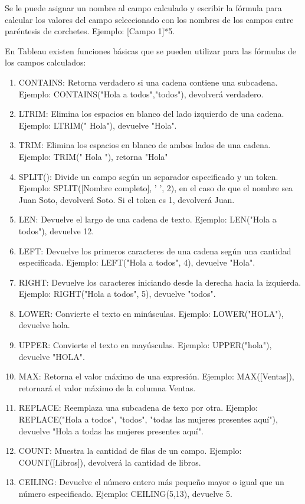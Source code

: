 \documentclass[a4paper, 12pt]{book}
\begin{document}
Se le puede asignar un nombre al campo calculado y escribir la fórmula para calcular los valores del campo seleccionado con los nombres de los campos entre paréntesis de corchetes. Ejemplo: [Campo 1]*5.

En Tableau existen funciones básicas que se pueden utilizar para las fórmulas de los campos calculados:
\begin{enumerate}
	\item CONTAINS: Retorna verdadero si una cadena contiene una subcadena. Ejemplo: CONTAINS("Hola a todos","todos"), devolverá verdadero.
	\item LTRIM: Elimina los espacios en blanco del lado izquierdo de una cadena. Ejemplo: LTRIM("    Hola"), devuelve "Hola".
	\item TRIM: Elimina los espacios en blanco de ambos lados de una cadena. Ejemplo: TRIM("  Hola  "), retorna "Hola"
	\item SPLIT(): Divide un campo según un separador especificado y un token. Ejemplo: SPLIT([Nombre completo], ' ', 2), en el caso de que el nombre sea Juan Soto, devolverá Soto. Si el token es 1, devolverá Juan.
	\item LEN: Devuelve el largo de una cadena de texto. Ejemplo: LEN("Hola a todos"), devuelve 12.
	\item LEFT: Devuelve los primeros caracteres de una cadena según una cantidad especificada. Ejemplo: LEFT("Hola a todos", 4), devuelve "Hola".
	\item RIGHT: Devuelve los caracteres iniciando desde la derecha hacia la izquierda. Ejemplo: RIGHT("Hola a todos", 5), devuelve "todos".
	\item LOWER: Convierte el texto en minúsculas. Ejemplo: LOWER("HOLA"), devuelve hola.
	\item UPPER: Convierte el texto en mayúsculas. Ejemplo: UPPER("hola"), devuelve "HOLA".
	\item MAX: Retorna el valor máximo de una expresión. Ejemplo: MAX([Ventas]), retornará el valor máximo de la columna Ventas.
	\item REPLACE: Reemplaza una subcadena de texo por otra. Ejemplo: REPLACE("Hola a todos", "todos", "todas las mujeres presentes aquí"), devuelve "Hola a todas las mujeres presentes aquí".
	\item COUNT: Muestra la cantidad de filas de un campo. Ejemplo: COUNT([Libros]), devolverá la cantidad de libros.
	\item CEILING: Devuelve el número entero más pequeño mayor o igual que un número especificado. Ejemplo: CEILING(5,13), devuelve 5.

\end{enumerate}
\end{document}
